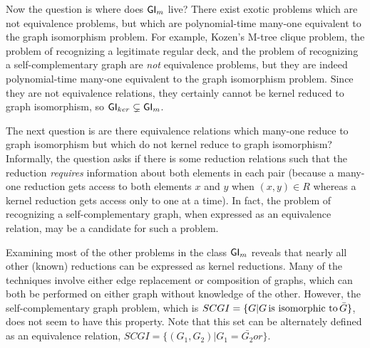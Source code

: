 
Now the question is where does ${\mathsf{GI}}_m$ live? There exist exotic problems which
are not equivalence problems, but which are polynomial-time many-one equivalent
to the graph isomorphism problem. For example, Kozen's M-tree clique problem,
the problem of recognizing a legitimate regular deck, and the problem of
recognizing a self-complementary graph are \emph{not} equivalence problems, but
they are indeed polynomial-time many-one equivalent to the graph isomorphism
problem. Since they are not equivalence relations, they certainly cannot be
kernel reduced to graph isomorphism, so ${\mathsf{GI}}_{ker}\subsetneq{\ensuremath{\mathsf{GI}}}_m$.

The next question is are there equivalence relations which many-one reduce to
graph isomorphism but which do not kernel reduce to graph isomorphism?
Informally, the question asks if there is some reduction relations such that
the reduction \emph{requires} information about both elements in each pair
(because a many-one reduction gets access to both elements $x$ and $y$ when
$(x,y)\in R$ whereas a kernel reduction gets access only to one at a time). In
fact, the problem of recognizing a self-complementary graph, when expressed as
an equivalence relation, may be a candidate for such a problem.

Examining most of the other problems in the class ${\mathsf{GI}}_m$ reveals that nearly
all other (known) reductions can be expressed as kernel reductions. Many of the
techniques involve either edge replacement or composition of graphs, which can
both be performed on either graph without knowledge of the other. However, the
self-complementary graph problem, which is $SCGI=\{G|G \,\text{is isomorphic to}\,
\bar{G}\}$, does not seem to have this property. Note that this set can be
alternately defined as an equivalence relation, $SCGI=\{(G_1,
G_2)|G_1=\bar{G_2} or \}$.

